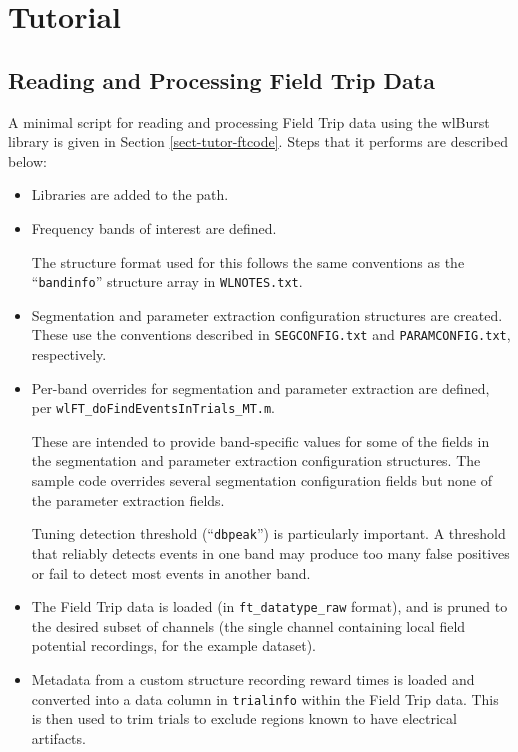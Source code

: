 
\chapter{Tutorial}
\label{sect-tutorial}

%
%
%
\section{Reading and Processing Field Trip Data}
\label{sect-tutor-ft}

A minimal script for reading and processing Field Trip data using the wlBurst
library is given in Section \ref{sect-tutor-ftcode}. Steps that it performs
are described below:

\begin{itemize}
%
\item Libraries are added to the path.
%
\item Frequency bands of interest are defined.

The structure format used for this follows the same conventions as the
``\texttt{bandinfo}'' structure array in \texttt{WLNOTES.txt}.
%
\item Segmentation and parameter extraction configuration structures are
created. These use the conventions described in \texttt{SEGCONFIG.txt}
and \texttt{PARAMCONFIG.txt}, respectively.
%
\item Per-band overrides for segmentation and parameter extraction are
defined, per \linebreak \texttt{wlFT\_doFindEventsInTrials\_MT.m}.

These are intended to provide band-specific values for some of the fields
in the segmentation and parameter extraction configuration structures. The
sample code overrides several segmentation configuration fields but none
of the parameter extraction fields.

Tuning detection threshold (``\texttt{dbpeak}'') is particularly important.
A threshold that reliably detects events in one band may produce too many
false positives or fail to detect most events in another band.
%
\item The Field Trip data is loaded (in \texttt{ft\_datatype\_raw} format),
and is pruned to the desired subset of channels (the single channel
containing local field potential recordings, for the example dataset).
%
\item Metadata from a custom structure recording reward times is loaded
and converted into a data column in \texttt{trialinfo} within the Field Trip
data. This is then used to trim trials to exclude regions known to have
electrical artifacts.


\end{itemize}
